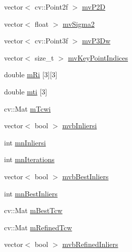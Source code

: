 \begin{DoxyCompactItemize}
\item 
vector$<$ cv\+::\+Point2f $>$ \mbox{\hyperlink{class_o_r_b___s_l_a_m2_1_1_pn_psolver_af3b3ccfff0f500c9e73efcb57d84474a}{mv\+P2D}}
\item 
vector$<$ float $>$ \mbox{\hyperlink{class_o_r_b___s_l_a_m2_1_1_pn_psolver_a7db84340cb13eff1148839ce5e77105b}{mv\+Sigma2}}
\item 
vector$<$ cv\+::\+Point3f $>$ \mbox{\hyperlink{class_o_r_b___s_l_a_m2_1_1_pn_psolver_a8498b32728a10f7e7ec834576ded87cf}{mv\+P3\+Dw}}
\item 
vector$<$ size\+\_\+t $>$ \mbox{\hyperlink{class_o_r_b___s_l_a_m2_1_1_pn_psolver_aa8d7d867978e933e5456c24a6f7433b0}{mv\+Key\+Point\+Indices}}
\item 
double \mbox{\hyperlink{class_o_r_b___s_l_a_m2_1_1_pn_psolver_ab66b8221ddd57480e0cff4fdf305f052}{m\+Ri}} \mbox{[}3\mbox{]}\mbox{[}3\mbox{]}
\item 
double \mbox{\hyperlink{class_o_r_b___s_l_a_m2_1_1_pn_psolver_ad55a5403377e0072fb551472b4698889}{mti}} \mbox{[}3\mbox{]}
\item 
cv\+::\+Mat \mbox{\hyperlink{class_o_r_b___s_l_a_m2_1_1_pn_psolver_a833616003399bd9392a403b789cfac41}{m\+Tcwi}}
\item 
vector$<$ bool $>$ \mbox{\hyperlink{class_o_r_b___s_l_a_m2_1_1_pn_psolver_a99bf8d10dff819b6f243b0b297627729}{mvb\+Inliersi}}
\item 
int \mbox{\hyperlink{class_o_r_b___s_l_a_m2_1_1_pn_psolver_a94dae01b8088d82477c6f18b32d8b7b0}{mn\+Inliersi}}
\item 
int \mbox{\hyperlink{class_o_r_b___s_l_a_m2_1_1_pn_psolver_acd174db02cc77182c187ceef74931f02}{mn\+Iterations}}
\item 
vector$<$ bool $>$ \mbox{\hyperlink{class_o_r_b___s_l_a_m2_1_1_pn_psolver_a9419f0917d2e1db0c1a76fe97cb4c326}{mvb\+Best\+Inliers}}
\item 
int \mbox{\hyperlink{class_o_r_b___s_l_a_m2_1_1_pn_psolver_aaa93341b33e4cb4a03b354e95aaa19e4}{mn\+Best\+Inliers}}
\item 
cv\+::\+Mat \mbox{\hyperlink{class_o_r_b___s_l_a_m2_1_1_pn_psolver_ab8090b33033ca9d0026113f2c1454fc8}{m\+Best\+Tcw}}
\item 
cv\+::\+Mat \mbox{\hyperlink{class_o_r_b___s_l_a_m2_1_1_pn_psolver_af6c081e732bbda232ccfff28ca9fc75e}{m\+Refined\+Tcw}}
\item 
vector$<$ bool $>$ \mbox{\hyperlink{class_o_r_b___s_l_a_m2_1_1_pn_psolver_a6688392be55984a41e6f540fea5f6a49}{mvb\+Refined\+Inliers}}
\item 

\end{DoxyCompactItemize}
